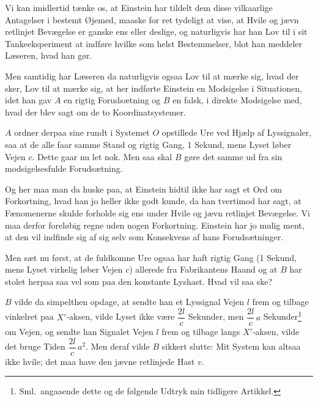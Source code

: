 \documentclass[12pt,a4paper]{article}
\newcommand{\opage}[1]{\marginnote{\footnotesize\textit{[#1]}}}
\begin{document}
Vi kan imidlertid tænke os, at Einstein har tildelt dem disse vilkaarlige
Antagelser i bestemt Øjemed, maaske for ret tydeligt at vise, at Hvile og jævn
retlinjet Bevægelse er ganske ens eller deslige, og naturligvis har han Lov til
i sit Tankeeksperiment at indføre hvilke som helst Bestemmelser, blot han
meddeler Læseren, hvad han gør.

Men samtidig har Læseren da naturligvis ogsaa Lov til at mærke sig, hvad der
sker, Lov til at mærke sig, at her indførte Einstein en Modsigelse i
Situationen, idet han gav $A$ en rigtig Forudsætning og $B$ en falsk, i direkte
Modsigelse med, hvad der blev sagt om de to Koordinatsystemer.

$A$ ordner derpaa sine rundt i Systemet $O$ opstillede Ure ved Hjælp af
Lyssignaler, saa at de alle faar samme Stand og rigtig Gang, 1 Sekund, mens
Lyset løber Vejen $c$. Dette gaar nu let nok. Men saa skal $B$ gøre det samme
ud fra sin modsigelsesfulde Forudsætning.

\opage{200} Og her maa man da huske paa, at Einstein hidtil ikke har sagt et Ord om
Forkortning, hvad han jo heller ikke godt kunde, da han tvertimod har sagt, at
Fænomenerne skulde forholde sig ens under Hvile og jævn retlinjet Bevægelse. Vi
maa derfor foreløbig regne uden nogen Forkortning. Einstein har jo mulig ment,
at den vil indfinde sig af sig selv som Konsekvens af hans Forudsætninger.

Men sæt nu først, at de \guillemotright fuldkomne\guillemotleft{} Ure ogsaa har
haft rigtig Gang (1 Sekund, mens Lyset virkelig løber Vejen $c$) allerede fra
Fabrikantens Haand og at $B$ har stolet herpaa saa vel som paa den konstante
Lyshast. Hvad vil saa ske?

$B$ vilde da simpelthen opdage, at sendte han et Lyssignal Vejen $l$ frem og
tilbage vinkelret paa $X'$-aksen, vilde Lyset ikke være $\dfrac{2l}{c}$
Sekunder, men $\dfrac{2l}{c}\,a$ Sekunder\footnote{Sml.\ angaaende dette og de
følgende Udtryk min tidligere Artikkel.} om Vejen, og sendte han Signalet Vejen
$l$ frem og tilbage langs $X'$-aksen, vilde det bruge Tiden
$\dfrac{2l}{c}\,a^{2}$. Men deraf vilde $B$ sikkert slutte: Mit System kan
altsaa ikke hvile; det maa have den jævne retlinjede Hast $v$.
\end{document}
